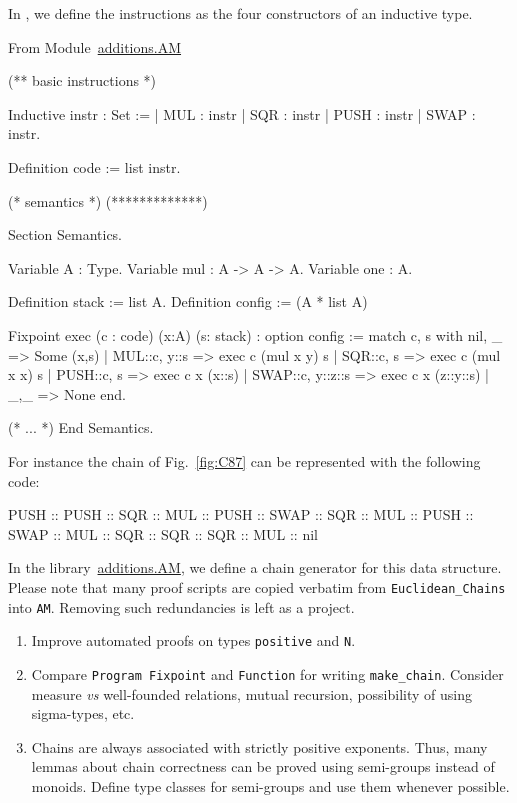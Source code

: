 In \coq{}, we define the instructions as the four constructors of an inductive type.

From Module~\href{../theories/html/additions.AM.html}{additions.AM}

\begin{Coqsrc}
(** basic instructions *)

Inductive instr : Set :=
  | MUL : instr
  | SQR : instr
  | PUSH : instr
  | SWAP : instr.       

Definition code := list instr.

(* semantics *)
(*************)

Section Semantics.

 Variable A : Type.
 Variable mul : A -> A -> A.
 Variable one : A.

 Definition stack := list A.
 Definition config := (A * list A)%

 Fixpoint exec (c : code) (x:A) (s: stack) : option config :=
   match c, s with
     nil, _ => Some (x,s)
   | MUL::c, y::s => exec c (mul x y) s
   | SQR::c, s => exec c (mul x x) s
   | PUSH::c, s => exec c x (x::s)
   | SWAP::c, y::z::s => exec c x (z::y::s)
   | _,_ => None
   end.

(* ... *)
End Semantics.
\end{Coqsrc}

For instance the chain of Fig.~\vref{fig:C87} can be represented with the following code:

\begin{Coqsrc}
  PUSH :: PUSH :: SQR  :: MUL :: PUSH :: SWAP :: SQR :: MUL :: PUSH
            :: SWAP :: MUL :: SQR :: SQR :: SQR :: MUL :: nil 
\end{Coqsrc}


In the library~\href{../theories/html/additions.AM.html}{additions.AM},
we define a chain generator for this data structure. 
Please note that many proof scripts are copied verbatim from 
\texttt{Euclidean\_Chains} into \texttt{AM}. Removing such redundancies is left as a project.



\begin{project}
 \begin{enumerate}
\item Improve automated proofs on types \texttt{positive} and \texttt{N}.
\item Compare  \texttt{Program Fixpoint} and \texttt{Function} for
writing \texttt{make\_chain}. Consider measure \emph{vs} well-founded 
relations, mutual recursion, possibility of using sigma-types, etc.
\item Chains are always associated with strictly positive exponents. 
Thus, many lemmas about chain correctness  can be proved using semi-groups instead of
monoids. Define type classes for semi-groups and use them whenever possible.
\end{enumerate}  
\end{project}



